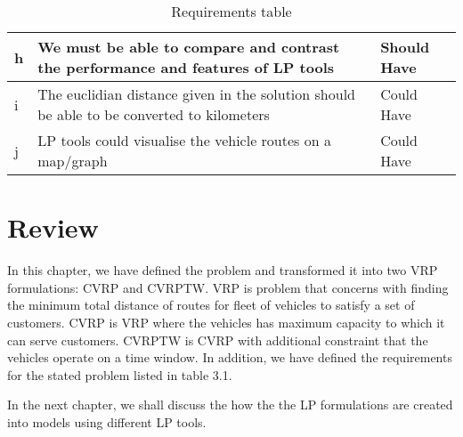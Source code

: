\begin{table}[!ht]
\begin{tabular}{|l|p{8cm}|l|}
h  & We must be able to compare and contrast the performance and features of LP tools                                                                                & Should Have \\ \hline
i  & The euclidian distance given in the solution should be able to be converted to kilometers                                                                       & Could Have  \\ \hline
j  & LP tools could visualise the vehicle routes on a map/graph                                                                                                      & Could Have  \\ \hline
\end{tabular}
\caption{Requirements table}
\label{requirements-table}
\end{table}

\section{Review}
In this chapter, we have defined the problem and transformed it into two VRP formulations: CVRP and CVRPTW. VRP is problem
that concerns with finding the minimum total distance of routes for fleet of vehicles to satisfy a set of customers. CVRP is VRP
where the vehicles has maximum capacity to which it can serve customers. CVRPTW is CVRP with additional constraint that
the vehicles operate on a time window. In addition, we have defined the requirements for the stated problem listed in table 3.1.

In the next chapter, we shall discuss the how the the LP formulations are created into models using different LP tools.